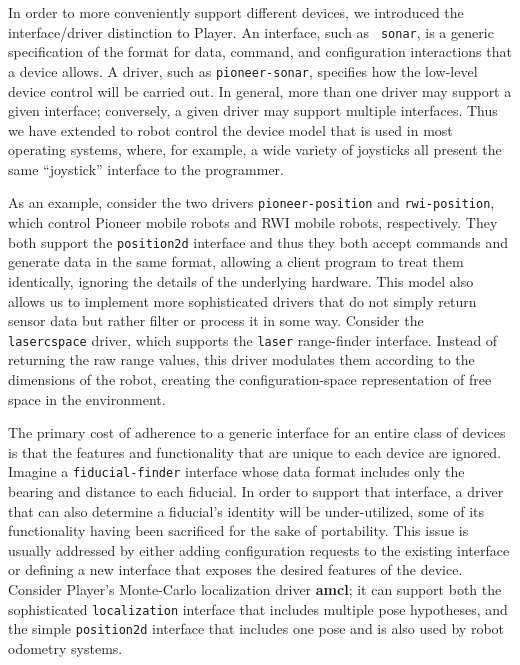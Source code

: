 In order to more conveniently support different devices, we introduced
the interface/driver distinction to Player. An interface, such as {\tt
sonar}, is a generic specification of the format for data, command,
and configuration interactions that a device allows.  A driver,
such as {\tt pioneer-sonar}, specifies how the low-level device
control will be carried out.  In general, more than one driver may
support a given interface; conversely, a given driver may support
multiple interfaces.  Thus we have extended to robot control the
device model that is used in most operating systems, where, for
example, a wide variety of joysticks all present the same ``joystick''
interface to the programmer.

As an example, consider the two drivers {\tt pioneer-position} and
{\tt rwi-position}, which control Pioneer mobile robots and RWI mobile
robots, respectively.  They both support the {\tt position2d} interface
and thus they both accept commands and generate data in the same
format, allowing a client program to treat them identically, ignoring
the details of the underlying hardware.  This model also allows us to
implement more sophisticated drivers that do not simply return sensor
data but rather filter or process it in some way.  Consider the {\tt
lasercspace} driver, which supports the {\tt laser} range-finder
interface.  Instead of returning the raw range values, this driver
modulates them according to the dimensions of the robot, creating the
configuration-space representation of free space in the environment.

The primary cost of adherence to a generic interface for an entire class
of devices is that the features and functionality that are unique to
each device are ignored.  Imagine a {\tt fiducial-finder} interface
whose data format includes only the bearing and distance to each
fiducial.  In order to support that interface, a driver that can also
determine a fiducial's identity will be under-utilized, some
of its functionality having been sacrificed for the sake of portability.
This issue is usually addressed by either adding configuration requests
to the existing interface or defining a new interface that exposes the
desired features of the device.  Consider Player's Monte-Carlo
localization driver {\bf amcl}; it can support both the sophisticated
{\tt localization} interface that includes multiple pose hypotheses,
and the simple {\tt position2d} interface that includes one pose and is
also used by robot odometry systems.

